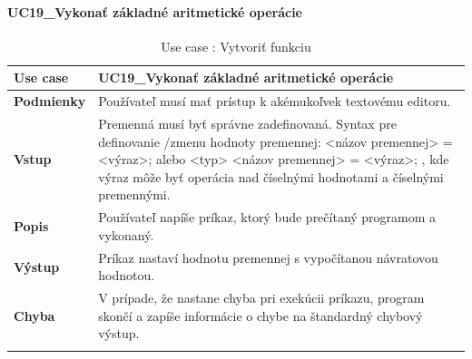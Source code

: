 \paragraph{UC19\_Vykonať základné aritmetické operácie}
\begin{center}
	\begin{longtable}{|p{2.5cm}|p{12.2cm}|}
		
			\hline
			\textbf{Use case} & UC19\_Vykonať základné aritmetické operácie \\ 
			\hline
			\textbf{Podmienky} & Používateľ musí mať prístup k akémukoľvek textovému editoru.  \\ 
			\hline
			\textbf{Vstup} & Premenná musí byť správne zadefinovaná. 
			\newline
			Syntax pre definovanie /zmenu hodnoty premennej: 
			\newline
			<názov premennej> = <výraz>; alebo 
			\newline
			<typ> <názov premennej> = <výraz>;
			\newline
			, kde výraz môže byť operácia nad číselnými hodnotami a číselnými premennými. \\
			\hline
			\textbf{Popis} & Používateľ napíše príkaz, ktorý bude prečítaný programom a vykonaný.\\ 
			\hline
			\textbf{Výstup} & Príkaz nastaví hodnotu premennej s vypočítanou návratovou hodnotou.\\
			\hline
			\textbf{Chyba} & V prípade, že nastane chyba pri exekúcii príkazu, program skončí a zapíše informácie o chybe na štandardný chybový výstup.\\
			\hline
		\caption{Use case : Vytvoriť funkciu}
		\label{table:1}
		
	\end{longtable}
\end{center}

